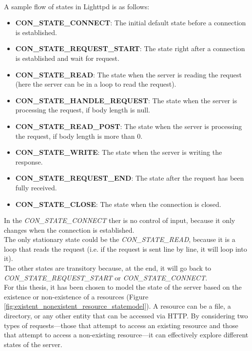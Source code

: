 \\A sample flow of states in Lighttpd is as follows:
\begin{itemize}
    \item \textbf{CON\_STATE\_CONNECT}: The initial default state before a connection is established.
    
    \item \textbf{CON\_STATE\_REQUEST\_START}: The state right after a connection is established and wait for request.
    
    \item \textbf{CON\_STATE\_READ}: The state when the server is reading the request (here the server can be in a loop to read the request).
    
    \item \textbf{CON\_STATE\_HANDLE\_REQUEST}: The state when the server is processing the request, if body length is null.
    
    \item \textbf{CON\_STATE\_READ\_POST}: The state when the server is processing the request, if body length is more than 0.
    
    \item \textbf{CON\_STATE\_WRITE}: The state when the server is writing the response.
    
    \item \textbf{CON\_STATE\_REQUEST\_END}: The state after the request has been fully received.
    
    \item \textbf{CON\_STATE\_CLOSE}: The state when the connection is closed.
\end{itemize}
In the \textit{CON\_STATE\_CONNECT} ther is no control of input, because it only changes when the connection is established.
\\The only stationary state could be the \textit{CON\_STATE\_READ}, because it is a loop that reads the request (i.e. if the request is sent line by line, it will loop into it).
\\The other states are transitory because, at the end, it will go back to \textit{CON\_STATE\_REQUEST\_START} or \textit{CON\_STATE\_CONNECT}.
\\For this thesis, it has been chosen to model the state of the server based on the existence or non-existence of a resources (Figure \ref{fig:existent_nonexistent_resource_statemodel}). A resource can be a file, a directory, or any other entity that can be accessed via HTTP. By considering two types of requests—those that attempt to access an existing resource and those that attempt to access a non-existing resource—it can effectively explore different states of the server.
